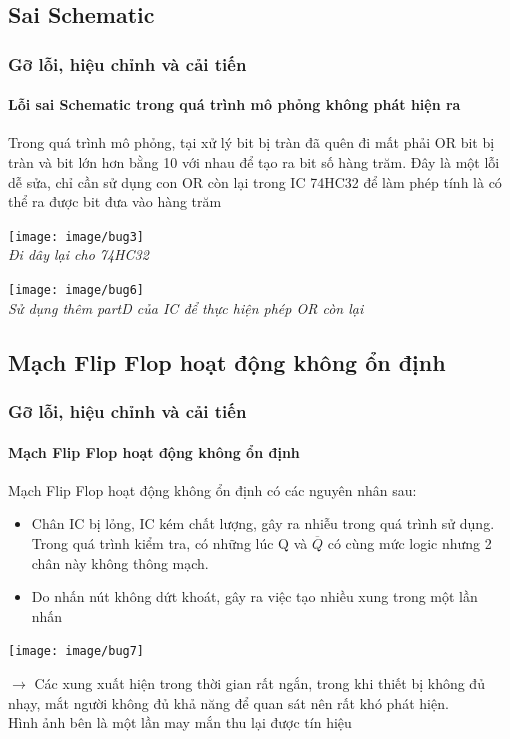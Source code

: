 \documentclass[12pt,a4paper]{beamer}
\begin{document}
	\subsection{Sai Schematic}
\begin{frame}
	\frametitle{Gỡ lỗi, hiệu chỉnh và cải tiến}
	\framesubtitle{Lỗi sai Schematic trong quá trình mô phỏng không phát hiện ra}

	Trong quá trình mô phỏng, tại xử lý bit bị tràn đã quên đi mất phải OR bit bị tràn và bit lớn hơn bằng 10 với nhau để tạo ra bit số hàng trăm. Đây là một lỗi dễ sửa, chỉ cần sử dụng con OR còn lại trong IC 74HC32 để làm phép tính là có thể ra được bit đưa vào hàng trăm
	\begin{multicols}{2}
		\begin{center}
			\texttt{[image: image/bug3]}\\
			\textit{Đi dây lại cho 74HC32}
		\end{center}
	\hfill\null\columnbreak
	\begin{center}
		\texttt{[image: image/bug6]}\\
		\textit{Sử dụng thêm partD của IC để thực hiện phép OR còn lại}
	\end{center}
	
	\end{multicols}
\end{frame}
	\subsection{Mạch Flip Flop hoạt động không ổn định}
\begin{frame}
	\frametitle{Gỡ lỗi, hiệu chỉnh và cải tiến}
	\framesubtitle{Mạch Flip Flop hoạt động không ổn định}

	Mạch Flip Flop hoạt động không ổn định có các nguyên nhân sau:
	\begin{itemize}
		\item Chân IC bị lỏng, IC kém chất lượng, gây ra nhiễu trong quá trình sử dụng. Trong quá trình kiểm tra, có những lúc Q và $\overline{Q}$ có cùng mức logic nhưng 2 chân này không thông mạch.
		\item Do nhấn nút không dứt khoát, gây ra việc tạo nhiều xung trong một lần nhấn
	\end{itemize}
\begin{multicols}{2}
	\begin{center}
		\texttt{[image: image/bug7]}
	\end{center}
	\newpage
	$\to$ Các xung xuất hiện trong thời gian rất ngắn, trong khi thiết bị không đủ nhạy, mắt người không đủ khả năng để quan sát nên rất khó phát hiện.\\
	Hình ảnh bên là một lần may mắn thu lại được tín hiệu
\end{multicols}
\end{frame}
\end{document}
